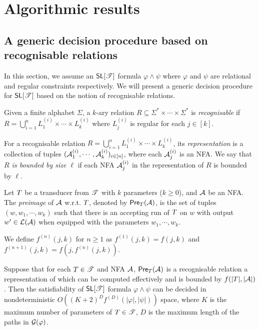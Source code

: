 
\section{Algorithmic results}
\label{sec:algo}


\subsection{A generic decision procedure based on recognisable relations}

In this section, we assume an $\textsf{SL}[\mathscr{T}]$ formula $\varphi \wedge \psi$ where $\varphi$ and $\psi$ are relational and  regular constraints respectively.
We will present a generic decision procedure for $\textsf{SL}[\mathscr{T}]$ based on the notion of recognisable relations.

\begin{definition}
	Given a finite alphabet $\Sigma$, a $k$-ary relation $R\subseteq \Sigma^*\times \cdots\times \Sigma^*$ is \emph{recognisable}  if $R=\bigcup_{i=1}^n L^{(i)}_1\times \cdots\times L^{(i)}_k$ where $L^{(i)}_j$ is regular for each $j\in [k]$.
%
\end{definition}

For a recognisable relation $R=\bigcup_{i=1}^n L^{(i)}_1\times \cdots\times L^{(i)}_k$, its \emph{representation} is a collection of tuples $(\mathcal{A}^{(i)}_1, \cdots, \mathcal{A}^{(i)}_k)_{i\in [n]}$, where each $\mathcal{A}^{(i)}_j$ is an NFA.  
We say that \emph{$R$ is bounded by size $\ell$} if each NFA  $\mathcal{A}^{(i)}_j$ in the representation of $R$ is bounded by $\ell$. 

Let $T$ be a transducer from $\mathscr{T}$ with $k$ parameters ($k\geq 0$), and $\mathcal{A}$ be an NFA. The \emph{preimage} of $\mathcal{A}$ w.r.t. $T$, denoted by $\textsf{Pre}_{T}(\mathcal{A})$, is the set of tuples $(w, w_1,\cdots, w_k)$ such that there is an accepting run of $T$ on $w$ with output $w'\in \mathcal{L}(\mathcal{A})$ when equipped with the parameters $w_1,\cdots, w_k$. 


We define $f^{(n)}(j, k)$ for $n\geq 1$ as $f^{(1)}(j,k)= f(j, k)$ and $f^{(n+1)}(j, k) = f(j, f^{(n)}(j,k))$.

\begin{theorem}\label{thm-generic-dec}
Suppose that %
for each $T \in \mathscr{T}$ and NFA $\mathcal{A}$, $\textsf{Pre}_{T}(\mathcal{A})$ is a recognisable relation a representation of which can be computed effectively and  is bounded by %
$f(|T|, |\mathcal{A}|)$. Then the satisfiability of $\textsf{SL}[\mathscr{T}]$ formula $\varphi \wedge \psi$ can be decided in nondeterministic  $O((K+2)^D f^{(D)}(|\varphi|, |\psi|))$ space, where $K$ is the maximum number of parameters of $T \in \mathscr{T}$, 
$D$ is the maximum length of the paths in $\mathcal{G}(\varphi)$.
\end{theorem}

